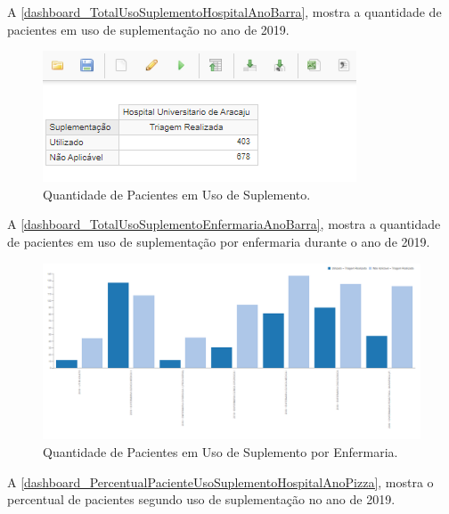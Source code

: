 \newpage
A \autoref{dashboard_TotalUsoSuplementoHospitalAnoBarra}, mostra a quantidade de pacientes em uso de suplementação no ano de 2019.

\begin{figure}[htb]
	\caption{\label{dashboard_TotalUsoSuplementoHospitalAnoBarra}Quantidade de Pacientes em Uso de Suplemento.}
	\begin{center}
	    \includegraphics[scale=1]{Imagens/5.1.TotalUsoSuplementoHospitalAnoBarra.png}
	\end{center}
\end{figure}

A \autoref{dashboard_TotalUsoSuplementoEnfermariaAnoBarra}, mostra a quantidade de pacientes em uso de suplementação por enfermaria durante o ano de 2019.

\begin{figure}[htb]
	\caption{\label{dashboard_TotalUsoSuplementoEnfermariaAnoBarra}Quantidade de Pacientes em Uso de Suplemento por Enfermaria.}
	\begin{center}
	    \includegraphics[scale=0.55]{Imagens/5.2.TotalUsoSuplementoEnfermariaAnoBarra.png}
	\end{center}
\end{figure}

\newpage
A \autoref{dashboard_PercentualPacienteUsoSuplementoHospitalAnoPizza}, mostra o percentual de pacientes segundo uso de suplementação no ano de 2019.

